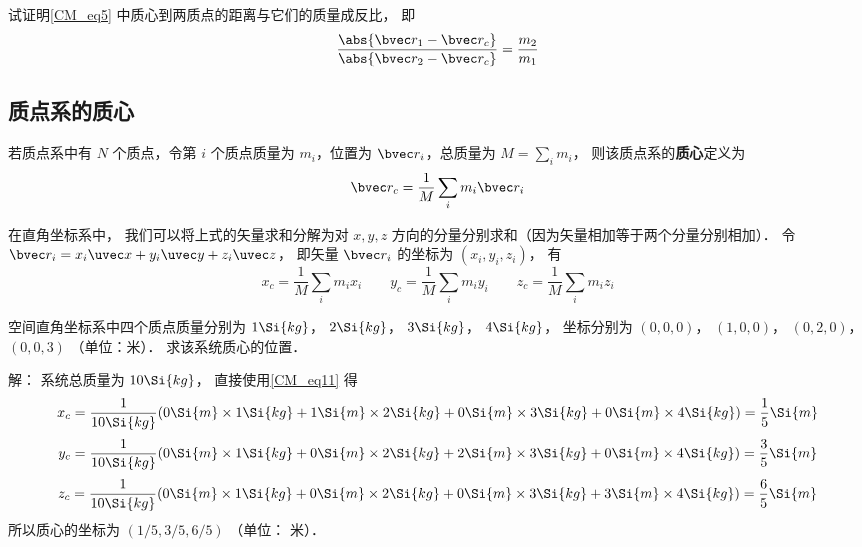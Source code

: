 \begin{exercise}{}
试证明\autoref{CM_eq5} 中质心到两质点的距离与它们的质量成反比， 即
\begin{equation}\label{CM_eq6}
\frac{\abs{\bvec r_1 - \bvec r_c}}{\abs{\bvec r_2 - \bvec r_c}} = \frac{m_2}{m_1}
\end{equation}
\end{exercise}

\subsection{质点系的质心}
若质点系中有 $N$ 个质点，令第 $i$ 个质点质量为 $m_i$，位置为 $\bvec r_i$，总质量为 $M = \sum\limits_i m_i$， 则该质点系的\textbf{质心}定义为
\begin{equation}\label{CM_eq1}
\bvec r_c = \frac{1}{M}\sum_i m_i \bvec r_i
\end{equation}

在直角坐标系中， 我们可以将上式的矢量求和分解为对 $x, y, z$ 方向的分量分别求和（因为矢量相加等于两个分量分别相加）． 令 $\bvec r_i = x_i \uvec x + y_i \uvec y + z_i \uvec z$， 即矢量 $\bvec r_i$ 的坐标为 $(x_i, y_i, z_i)$， 有
\begin{equation}\label{CM_eq11}
x_c = \frac{1}{M}\sum_i m_i x_i \qquad
y_c = \frac{1}{M}\sum_i m_i y_i \qquad
z_c = \frac{1}{M}\sum_i m_i z_i
\end{equation}

\begin{example}{}
空间直角坐标系中四个质点质量分别为 $1 \Si{kg}$， $2 \Si{kg}$， $3 \Si{kg}$， $4 \Si{kg}$， 坐标分别为 $(0, 0, 0)$， $(1, 0, 0)$， $(0, 2, 0)$， $(0, 0, 3)$ （单位：米）． 求该系统质心的位置．

解： 系统总质量为 $10 \Si{kg}$， 直接使用\autoref{CM_eq11} 得
\begin{equation}
x_c = \frac{1}{10 \Si{kg}} (0 \Si{m} \times 1 \Si{kg} + 1 \Si{m}\times 2 \Si{kg} + 0\Si{m} \times 3 \Si{kg} + 0 \Si{m}\times 4 \Si{kg}) = \frac15 \Si{m}
\end{equation}
\begin{equation}
y_c = \frac{1}{10 \Si{kg}} (0\Si{m}\times 1 \Si{kg} + 0\Si{m} \times 2 \Si{kg} + 2\Si{m} \times 3 \Si{kg} + 0 \Si{m}\times 4 \Si{kg}) = \frac35 \Si{m}
\end{equation}
\begin{equation}
z_c = \frac{1}{10 \Si{kg}} (0\Si{m}\times 1 \Si{kg} + 0\Si{m} \times 2 \Si{kg} + 0\Si{m} \times 3 \Si{kg} + 3 \Si{m}\times 4 \Si{kg}) = \frac65 \Si{m}
\end{equation}
所以质心的坐标为 $(1/5, 3/5, 6/5)$ （单位： 米）．
\end{example}

